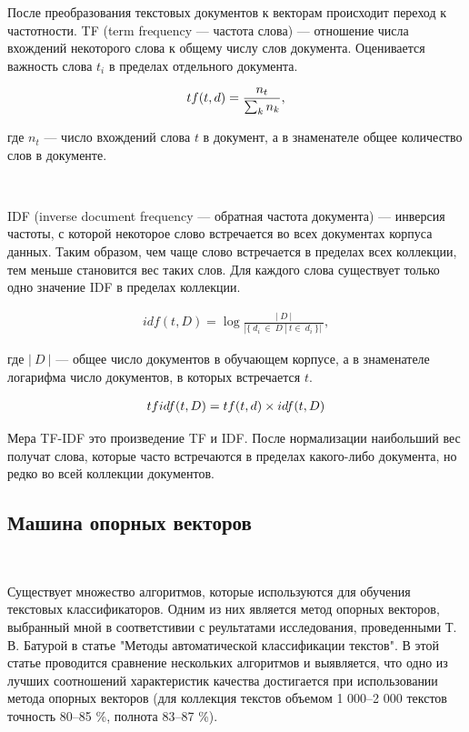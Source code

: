 После преобразования текстовых документов к векторам происходит переход к частотности. TF (term frequency — частота слова) — отношение числа вхождений некоторого слова к общему числу слов документа. Оценивается важность слова $t_{i}$ в пределах отдельного документа.

\begin{align} 
tf(t, d) = \frac{n_{t}}{\sum_{k}n_{k}}, \normalsize
\end{align}

где $n_{t}$ — число вхождений слова $t$ в документ, а в знаменателе общее количество слов в документе.

\

IDF (inverse document frequency — обратная частота документа) — инверсия частоты, с которой некоторое слово встречается во всех документах корпуса данных. Таким образом, чем чаще слово встречается в пределах всех коллекции, тем меньше становится вес таких слов. Для каждого слова существует только одно значение IDF в пределах коллекции.

\begin{align} 
idf(t, D) = \log\frac{|\:D\:|}{| \{ \: d_{i} \: \in \: D \: | \: t \in \: d_{i} \: \}| \:},
\end{align}

где $|\:D\:|$ — общее число документов в обучающем корпусе, а в знаменателе логарифма число документов, в которых встречается $t$.

\begin{align} 
tf\-idf(t, D) = tf(t, d) \times idf(t, D)
\end{align}

Мера TF-IDF это произведение TF и IDF. После нормализации наибольший вес получат слова, которые часто встречаются в пределах какого-либо документа, но редко во всей коллекции документов. 

\newpage
\subsection{Машина опорных векторов}
\

Существует множество алгоритмов, которые используются для обучения текстовых классификаторов. Одним из них является метод опорных векторов, выбранный мной в соответстивии с реультатами исследования, проведенными Т. В. Батурой в статье "Методы автоматической классификации текстов".\cite{TEXTCLASSIFICATION} В этой статье проводится сравнение нескольких алгоритмов и выявляется, что одно из лучших соотношений характеристик качества достигается при использовании метода опорных векторов (для коллекция текстов объемом 1 000–2 000 текстов точность 80–85 \%, полнота 83–87 \%).

